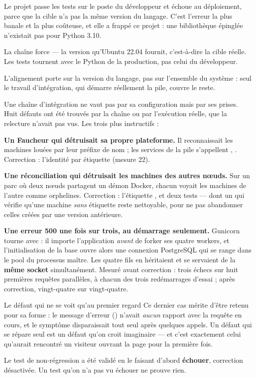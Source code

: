 \menace
Le projet passe les tests sur le poste du développeur et échoue au
déploiement, parce que la cible n'a pas la même version du langage. C'est
l'erreur la plus banale et la plus coûteuse, et elle a frappé ce projet : une
bibliothèque épinglée n'existait pas pour Python 3.10.

\parade
La chaîne force  --- la version qu'Ubuntu 22.04
fournit, c'est-à-dire la cible réelle. Les tests tournent avec le Python de la
production, pas celui du développeur.

\limite
L'alignement porte sur la version du langage, pas sur l'ensemble du système :
seul le travail d'intégration, qui démarre réellement la pile, couvre le reste.


Une chaîne d'intégration ne vaut pas par sa configuration mais par ses prises.
Huit défauts ont été trouvés par la chaîne ou par l'exécution réelle, que la
relecture n'avait pas vus. Les trois plus instructifs :

\textbf{Un Faucheur qui détruisait sa propre plateforme.} Il reconnaissait les
machines louées par leur préfixe de nom ; les services de la pile
s'appellent , . Correction : l'identité
par étiquette (mesure 22).

\textbf{Une réconciliation qui détruisait les machines des autres nœuds.} Sur
un parc où deux nœuds partagent un démon Docker, chacun voyait les machines de
l'autre comme orphelines. Correction : l'étiquette , et
deux tests --- dont un qui vérifie qu'une machine \emph{sans} étiquette reste
nettoyable, pour ne pas abandonner celles créées par une version antérieure.

\textbf{Une erreur 500 une fois sur trois, au démarrage seulement.} Gunicorn
tourne avec  : il importe l'application \emph{avant} de forker
ses quatre workers, et l'initialisation de la base ouvre alors une connexion
PostgreSQL qui se range dans le pool du processus maître. Les quatre fils en
héritaient et se servaient de la \textbf{même socket} simultanément. Mesuré
avant correction : trois échecs sur huit premières requêtes parallèles, à
chacun des trois redémarrages d'essai ; après correction, vingt-quatre sur
vingt-quatre.

\begin{piege}{Le défaut qui ne se voit qu'au premier regard}
Ce dernier cas mérite d'être retenu pour sa forme : le message d'erreur
() n'avait \emph{aucun} rapport
avec la requête en cours, et le symptôme disparaissait tout seul après
quelques appels. Un défaut qui se répare seul est un défaut qu'on croit
imaginaire --- et c'est exactement celui qu'aurait rencontré un visiteur
ouvrant la page pour la première fois.

Le test de non-régression a été validé en le faisant d'abord \textbf{échouer},
correction désactivée. Un test qu'on n'a pas vu échouer ne prouve rien.
\end{piege}
